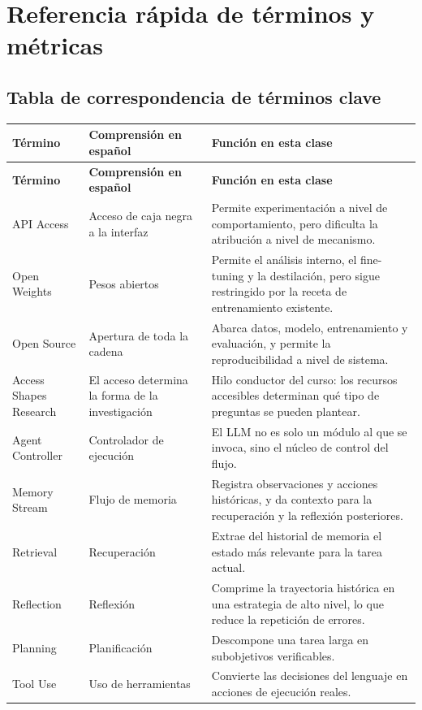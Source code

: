 \section{Referencia rápida de términos y métricas}

\subsection{Tabla de correspondencia de términos clave}
\begin{longtable}{p{2.7cm}p{3.2cm}p{5.6cm}}
\toprule
\textbf{Término} & \textbf{Comprensión en español} & \textbf{Función en esta clase} \\
\midrule
\endfirsthead
\toprule
\textbf{Término} & \textbf{Comprensión en español} & \textbf{Función en esta clase} \\
\midrule
\endhead
API Access & Acceso de caja negra a la interfaz & Permite experimentación a nivel de comportamiento, pero dificulta la atribución a nivel de mecanismo. \\
Open Weights & Pesos abiertos & Permite el análisis interno, el fine-tuning y la destilación, pero sigue restringido por la receta de entrenamiento existente. \\
Open Source & Apertura de toda la cadena & Abarca datos, modelo, entrenamiento y evaluación, y permite la reproducibilidad a nivel de sistema. \\
Access Shapes Research & El acceso determina la forma de la investigación & Hilo conductor del curso: los recursos accesibles determinan qué tipo de preguntas se pueden plantear. \\
Agent Controller & Controlador de ejecución & El LLM no es solo un módulo al que se invoca, sino el núcleo de control del flujo. \\
Memory Stream & Flujo de memoria & Registra observaciones y acciones históricas, y da contexto para la recuperación y la reflexión posteriores. \\
Retrieval & Recuperación & Extrae del historial de memoria el estado más relevante para la tarea actual. \\
Reflection & Reflexión & Comprime la trayectoria histórica en una estrategia de alto nivel, lo que reduce la repetición de errores. \\
Planning & Planificación & Descompone una tarea larga en subobjetivos verificables. \\
Tool Use & Uso de herramientas & Convierte las decisiones del lenguaje en acciones de ejecución reales. \\

\end{longtable}
